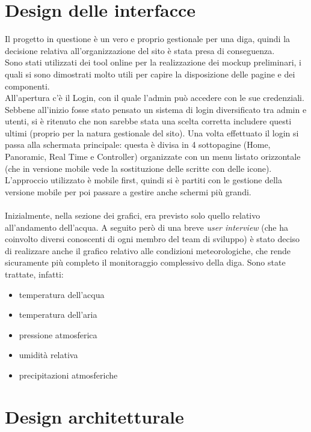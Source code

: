 \documentclass[a4paper,12pt]{report}
\begin{document}
\section{Design delle interfacce}\label{sec:design_interfacce}
Il progetto in questione è un vero e proprio gestionale per una diga, quindi la decisione relativa all'organizzazione del sito è stata presa di conseguenza.\\
Sono stati utilizzati dei tool online per la realizzazione dei mockup preliminari, i quali si sono dimostrati molto utili per capire la disposizione delle pagine e dei componenti.\\
All'apertura c'è il Login, con il quale l'admin può accedere con le sue credenziali. Sebbene all'inizio fosse stato pensato un sistema di login diversificato tra admin e utenti, si è ritenuto che non sarebbe stata una scelta corretta includere questi ultimi (proprio per la natura gestionale del sito). Una volta effettuato il login si passa alla schermata principale: questa è divisa in 4 sottopagine (Home, Panoramic, Real Time e Controller) organizzate con un menu listato orizzontale (che in versione mobile vede la sostituzione delle scritte con delle icone). L'approccio utilizzato è mobile first, quindi si è partiti con le gestione della versione mobile per poi passare a gestire anche schermi più grandi.\\\\
Inizialmente, nella sezione dei grafici, era previsto solo quello relativo all'andamento dell'acqua. A seguito però di una breve \emph{user interview} (che ha coinvolto diversi conoscenti di ogni membro del team di sviluppo) è stato deciso di realizzare anche il grafico relativo alle condizioni meteorologiche, che rende sicuramente più completo il monitoraggio complessivo della diga. Sono state trattate, infatti:
\begin{itemize}
    \item temperatura dell'acqua
    \item temperatura dell'aria
    \item pressione atmosferica
    \item umidità relativa
    \item precipitazioni atmosferiche
\end{itemize}

\section{Design architetturale}
\end{document}
